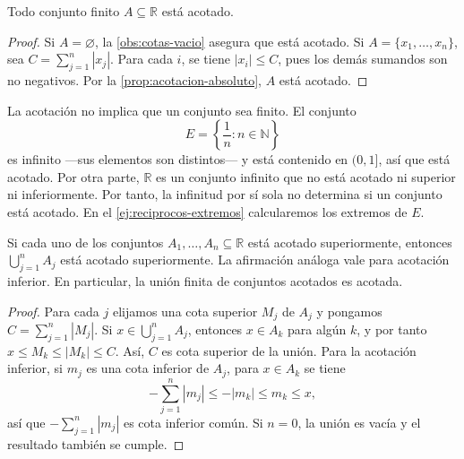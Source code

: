 \begin{samepage}
\begin{proposition}
\label{prop:finito-acotado}
Todo conjunto finito $A\subseteq\mathbb{R}$ está acotado.
\end{proposition}
\end{samepage}

\begin{proof}
Si $A=\varnothing$, la \cref{obs:cotas-vacio} asegura que está acotado. Si $A=\{x_1,\ldots,x_n\}$, sea $C=\sum_{j=1}^{n}|x_j|$. Para cada $i$, se tiene $|x_i|\leq C$, pues los demás sumandos son no negativos. Por la \cref{prop:acotacion-absoluto}, $A$ está acotado.
\end{proof}

\begin{example}
La acotación no implica que un conjunto sea finito. El conjunto
\[
 E=\left\{\frac1n:n\in\mathbb{N}\right\}
\]
es infinito —sus elementos son distintos— y está contenido en $(0,1]$, así que está acotado. Por otra parte, $\mathbb{R}$ es un conjunto infinito que no está acotado ni superior ni inferiormente. Por tanto, la infinitud por sí sola no determina si un conjunto está acotado. En el \cref{ej:reciprocos-extremos} calcularemos los extremos de $E$.
\end{example}

\begin{samepage}
\begin{proposition}
\label{prop:union-acotada}
Si cada uno de los conjuntos $A_1,\ldots,A_n\subseteq\mathbb{R}$ está acotado superiormente, entonces $\bigcup_{j=1}^n A_j$ está acotado superiormente. La afirmación análoga vale para acotación inferior. En particular, la unión finita de conjuntos acotados es acotada.
\end{proposition}
\end{samepage}

\begin{proof}
Para cada $j$ elijamos una cota superior $M_j$ de $A_j$ y pongamos $C=\sum_{j=1}^n|M_j|$. Si $x\in\bigcup_{j=1}^n A_j$, entonces $x\in A_k$ para algún $k$, y por tanto $x\leq M_k\leq |M_k|\leq C$. Así, $C$ es cota superior de la unión. Para la acotación inferior, si $m_j$ es una cota inferior de $A_j$, para $x\in A_k$ se tiene
\[
 -\sum_{j=1}^n|m_j|\leq-|m_k|\leq m_k\leq x,
\]
así que $-\sum_{j=1}^n|m_j|$ es cota inferior común. Si $n=0$, la unión es vacía y el resultado también se cumple.
\end{proof}

